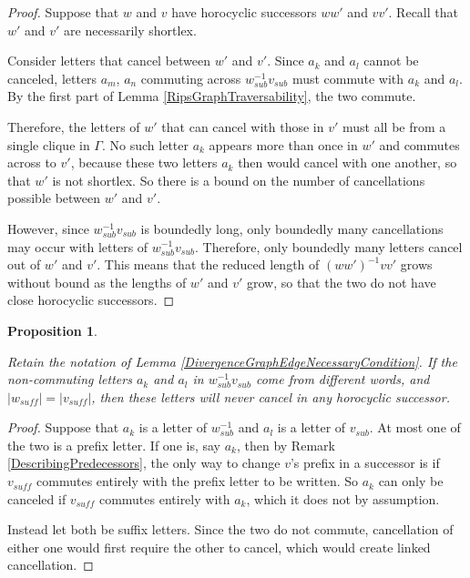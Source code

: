 \documentclass[10pt,a4paper]{amsart}
\newtheorem{proposition}[theorem]{Proposition}
\theoremstyle{definition}
\theoremstyle{remark}
\begin{document}
	\begin{proof}
		
		Suppose that $w$ and $v$ have horocyclic successors $ww'$ and $vv'$. Recall that $w'$ and $v'$ are necessarily shortlex.
		
		Consider letters that cancel between $w'$ and $v'$. Since $a_k$ and $a_l$ cannot be canceled, letters $a_m$, $a_n$ commuting across $w_{sub}^{-1}v_{sub}$ must commute with $a_k$ and $a_l$. By the first part of Lemma \ref{RipsGraphTraversability}, the two commute.
		
		Therefore, the letters of $w'$ that can cancel with those in $v'$ must all be from a single clique in $\Gamma$. No such letter $a_k$ appears more than once in $w'$ and commutes across to $v'$, because these two letters $a_k$ then would cancel with one another, so that $w'$ is not shortlex. So there is a bound on the number of cancellations possible between $w'$ and $v'$.
		
		However, since $w_{sub}^{-1}v_{sub}$ is boundedly long, only boundedly many cancellations may occur with letters of $w_{sub}^{-1}v_{sub}$. Therefore, only boundedly many letters cancel out of $w'$ and $v'$. This means that the reduced length of $(ww')^{-1}vv'$ grows without bound as the lengths of $w'$ and $v'$ grow, so that the two do not have close horocyclic successors.	
	\end{proof}
	
	\begin{proposition} \label{NonCommutingLettersInDifferentWords}
		
		Retain the notation of Lemma \ref{DivergenceGraphEdgeNecessaryCondition}. If the non-commuting letters $a_k$ and $a_l$ in $w_{sub}^{-1}v_{sub}$ come from different words, and $|w_{suff}|=|v_{suff}|$, then these letters will never cancel in any horocyclic successor.
		
	\end{proposition}
	
	\begin{proof}
		
		Suppose that $a_k$ is a letter of $w_{sub}^{-1}$ and $a_l$ is a letter of $v_{sub}$. At most one of the two is a prefix letter. If one is, say $a_k$, then by Remark \ref{DescribingPredecessors}, the only way to change $v$'s prefix in a successor is if $v_{suff}$ commutes entirely with the prefix letter to be written. So $a_k$ can only be canceled if $v_{suff}$ commutes entirely with $a_k$, which it does not by assumption.
		
		Instead let both be suffix letters. Since the two do not commute, cancellation of either one would first require the other to cancel, which would create linked cancellation.	
	\end{proof}
	
\end{document}
